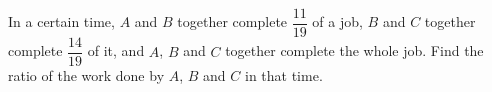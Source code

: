 In a certain time, $A$ and $B$ together complete $\dfrac{11}{19}$ of a job, $B$ and $C$ together complete $\dfrac{14}{19}$ of it, and $A$, $B$ and $C$ together complete the whole job. Find the ratio of the work done by $A$, $B$ and $C$ in that time.

